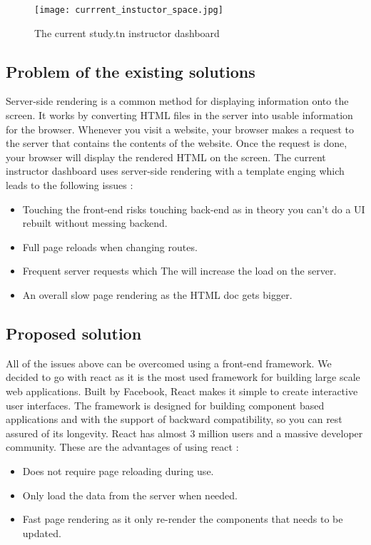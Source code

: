 \begin{figure}[!ht]
    \centering
    \texttt{[image: currrent\_instuctor\_space.jpg]}
    \caption{The current study.tn instructor dashboard}
    \label{fig:currrent_instuctor_space}
\end{figure}

\subsection{Problem of the existing solutions}
Server-side rendering is a common method for displaying information onto the screen. It works by converting HTML files in the server into usable information for the browser. Whenever you visit a website, your browser makes a request to the server that contains the contents of the website. Once the request is done, your browser will display the rendered HTML on the screen. The current instructor dashboard uses server-side rendering with a template enging which leads to the following issues : 
\hfill \break
\begin{itemize}
  \item Touching the front-end risks touching back-end as in theory you can't do a UI rebuilt without messing backend.
  \item Full page reloads when changing routes.
  \item Frequent server requests which The will increase the load on the server.
  \item An overall slow page rendering as the HTML doc gets bigger.

\end{itemize}

\subsection{Proposed solution}
All of the issues above can be overcomed using a front-end framework. We decided to go with react as it is the most used framework for building large scale web applications. Built by Facebook, React makes it simple to create interactive user interfaces. The framework is designed for building component based applications and with the support of backward compatibility, so you can rest assured of its longevity. React has almost 3 million users and a massive developer community. These are the advantages of using react :

\hfill \break

\begin{itemize}
  \item Does not require page reloading during use.
  \item Only load the data from the server when needed.
  \item Fast page rendering as it only re-render the components that needs to be updated.
\end{itemize}


